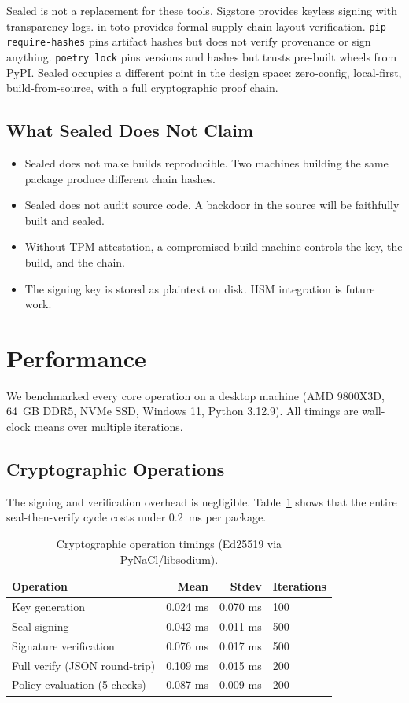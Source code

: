 \documentclass[11pt,a4paper]{article}
\begin{document}
Sealed is not a replacement for these tools. Sigstore provides keyless signing with transparency logs. in-toto provides formal supply chain layout verification. \texttt{pip --require-hashes} pins artifact hashes but does not verify provenance or sign anything. \texttt{poetry lock} pins versions and hashes but trusts pre-built wheels from PyPI. Sealed occupies a different point in the design space: zero-config, local-first, build-from-source, with a full cryptographic proof chain.

\subsection{What Sealed Does Not Claim}

\begin{itemize}
  \item Sealed does not make builds reproducible. Two machines building the same package produce different chain hashes.
  \item Sealed does not audit source code. A backdoor in the source will be faithfully built and sealed.
  \item Without TPM attestation, a compromised build machine controls the key, the build, and the chain.
  \item The signing key is stored as plaintext on disk. HSM integration is future work.
\end{itemize}

\section{Performance}

We benchmarked every core operation on a desktop machine (AMD 9800X3D, 64~GB DDR5, NVMe SSD, Windows 11, Python 3.12.9). All timings are wall-clock means over multiple iterations.

\subsection{Cryptographic Operations}

The signing and verification overhead is negligible. Table~\ref{tab:crypto} shows that the entire seal-then-verify cycle costs under 0.2~ms per package.

\begin{table}[h]
\centering
\caption{Cryptographic operation timings (Ed25519 via PyNaCl/libsodium).}
\label{tab:crypto}
\begin{tabular}{lrrl}
\toprule
\textbf{Operation} & \textbf{Mean} & \textbf{Stdev} & \textbf{Iterations} \\
\midrule
Key generation & 0.024 ms & 0.070 ms & 100 \\
Seal signing & 0.042 ms & 0.011 ms & 500 \\
Signature verification & 0.076 ms & 0.017 ms & 500 \\
Full verify (JSON round-trip) & 0.109 ms & 0.015 ms & 200 \\
Policy evaluation (5 checks) & 0.087 ms & 0.009 ms & 200 \\
\bottomrule
\end{tabular}
\end{table}
\end{document}
